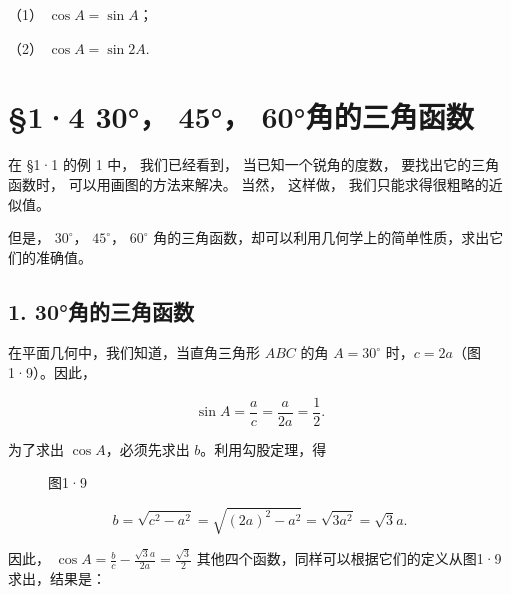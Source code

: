 （1） \(\cos A = \sin A\)；

（2） \(\cos A = \sin 2A.\)

\section{§1·4 30°， 45°， 60°角的三角函数}

在 §1·1 的例 1 中， 我们已经看到， 当已知一个锐角的度数，
要找出它的三角函数时， 可以用画图的方法来解决。 当然， 这样做，
我们只能求得很粗略的近似值。

但是， \(30^{\circ}\)， \(45^{\circ}\)， \(60^{\circ}\)
角的三角函数，却可以利用几何学上的简单性质，求出它们的准确值。

\subsection{1. 30°角的三角函数}

在平面几何中，我们知道，当直角三角形 \(ABC\) 的角 \(A = 30^{\circ}\)
时，\(c = 2a\)（图1·9）。因此，

\[
\sin A = \frac {a}{c} = \frac {a}{2 a} = \frac {1}{2}.
\]

为了求出 \(\cos A\)，必须先求出 \(b\)。利用勾股定理，得

\begin{figure}
\centering
{}
\caption{图1·9}
\end{figure}


\[
b = \sqrt {c ^ {2} - a ^ {2}} = \sqrt {(2 a) ^ {2} - a ^ {2}} = \sqrt {3 a ^ {2}} = \sqrt {3} a.
\]

因此，
\(\cos A = \frac{b}{c} -\frac{\sqrt{3}a}{2a} = \frac{\sqrt{3}}{2}\)
其他四个函数，同样可以根据它们的定义从图1·9求出，结果是：

